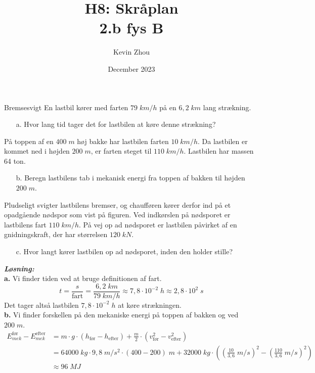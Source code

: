 \documentclass{report}
\title{H8: Skråplan\\
{\Large \textbf{2.b fys B}}}
\author{Kevin Zhou}
\date{December 2023}
\newcommand{\sol}{\setlength{\parindent}{0cm}\textbf{\textit{Løsning:}}\setlength{\parindent}{1cm}}
\begin{document}
\maketitle
\begin{question}{Bremsesvigt}{}
  En lastbil kører med farten $79 \;\unit{km/h} $ på en $6,2 \;\unit{km} $ lang strækning.
  \begin{itemize}
    \item[a.] Hvor lang tid tager det for lastbilen at køre denne strækning?
  \end{itemize}
  På toppen af en $400 \;\unit{m} $ høj bakke har lastbilen farten $10 \;\unit{ km/h}$. Da lastbilen er kommet ned i højden $200 \;\unit{m}$, er farten steget til $110 \;\unit{km/h}$. Lastbilen har massen 64 ton.
  \begin{itemize}
    \item[b.] Beregn lastbilens tab i mekanisk energi fra toppen af bakken til højden $200 \;\unit{m}$.
  \end{itemize}
  Pludseligt svigter lastbilens bremser, og chaufføren kører derfor ind på et opadgående nødspor som vist på figuren. Ved indkørslen på nødsporet er lastbilens fart $110 \;\unit{km/h}$. 
  På vej op ad nødsporet er lastbilen påvirket af en gnidningskraft, der har størrelsen $120 \;\unit{kN} $.
  \begin{itemize}
    \item[c.] Hvor langt kører lastbilen op ad nødsporet, inden den holder stille?
  \end{itemize}
\end{question}
\sol \\ 
\textbf{a.} Vi finder tiden ved at bruge definitionen af fart.
\[
t=\frac{s}{\text{fart}}=\frac{6,2 \;\unit{km} }{79 \;\unit{km/h} }\approx 7,8\cdot 10^{-2}\;\unit{h}\approx 2,8\cdot 10^2 \;\unit{s} 
\] 
Det tager altså lastbilen $7,8\cdot 10^{-2}\;\unit{h}$ at køre strækningen. \\[1ex]
\textbf{b.} Vi finder forskellen på den mekaniske energi på toppen af bakken og ved $200 \;\unit{m} $.
\begin{equation*}
\begin{split}
  E^{\text{før} }_{mek}-E^{\text{efter} }_{mek}&=m\cdot g \cdot \left(h_{\text{før} }- h_{\text{efter} }\right)  + \frac{m}{2} \cdot \left(v_{\text{før} }^2-v_{\text{efter}}^2 \right) \\ 
  &=64000 \;\unit{kg} \cdot 9,8 \;\unit{m/s^2} \cdot (400-200)\;\unit{m} + 32000 \;\unit{kg}\cdot \left(\left(\frac{10}{3,6} \;\unit{m/s} \right)^2-\left(\frac{110}{3,6} \;\unit{m/s} \right)^2\right) \\ 
  &\approx 96 \;\unit{MJ} 
\end{split}
\end{equation*}
\end{document}
